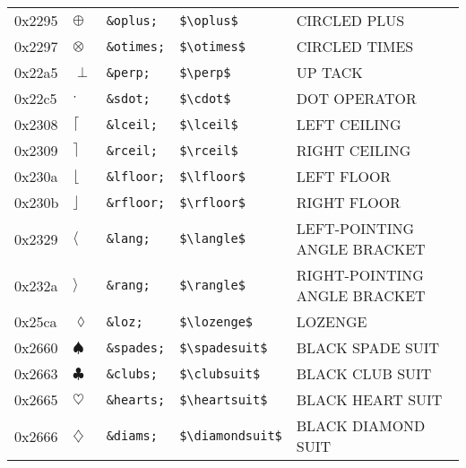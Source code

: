 \documentclass[a4paper,10pt]{article}
\begin{document}
{\begin{center}
\begin{xtabular}{llllp{10cm}}
0x2295 & $\oplus$               & \texttt{\&oplus;}   & \texttt{\${\textbackslash}oplus\$}                     & CIRCLED PLUS                               \\
0x2297 & $\otimes$              & \texttt{\&otimes;}  & \texttt{\${\textbackslash}otimes\$}                    & CIRCLED TIMES                              \\
0x22a5 & $\perp$                & \texttt{\&perp;}    & \texttt{\${\textbackslash}perp\$}                      & UP TACK                                    \\
0x22c5 & $\cdot$                & \texttt{\&sdot;}    & \texttt{\${\textbackslash}cdot\$}                      & DOT OPERATOR                               \\
0x2308 & $\lceil$               & \texttt{\&lceil;}   & \texttt{\${\textbackslash}lceil\$}                     & LEFT CEILING                               \\
0x2309 & $\rceil$               & \texttt{\&rceil;}   & \texttt{\${\textbackslash}rceil\$}                     & RIGHT CEILING                              \\
0x230a & $\lfloor$              & \texttt{\&lfloor;}  & \texttt{\${\textbackslash}lfloor\$}                    & LEFT FLOOR                                 \\
0x230b & $\rfloor$              & \texttt{\&rfloor;}  & \texttt{\${\textbackslash}rfloor\$}                    & RIGHT FLOOR                                \\
0x2329 & $\langle$              & \texttt{\&lang;}    & \texttt{\${\textbackslash}langle\$}                    & LEFT-POINTING ANGLE BRACKET                \\
0x232a & $\rangle$              & \texttt{\&rang;}    & \texttt{\${\textbackslash}rangle\$}                    & RIGHT-POINTING ANGLE BRACKET               \\
0x25ca & $\lozenge$             & \texttt{\&loz;}     & \texttt{\${\textbackslash}lozenge\$}                   & LOZENGE                                    \\
0x2660 & $\spadesuit$           & \texttt{\&spades;}  & \texttt{\${\textbackslash}spadesuit\$}                 & BLACK SPADE SUIT                           \\
0x2663 & $\clubsuit$            & \texttt{\&clubs;}   & \texttt{\${\textbackslash}clubsuit\$}                  & BLACK CLUB SUIT                            \\
0x2665 & $\heartsuit$           & \texttt{\&hearts;}  & \texttt{\${\textbackslash}heartsuit\$}                 & BLACK HEART SUIT                           \\
0x2666 & $\diamondsuit$         & \texttt{\&diams;}   & \texttt{\${\textbackslash}diamondsuit\$}               & BLACK DIAMOND SUIT                         \\
\bottomrule
\end{xtabular}
\end{center}
} 
\end{document}
